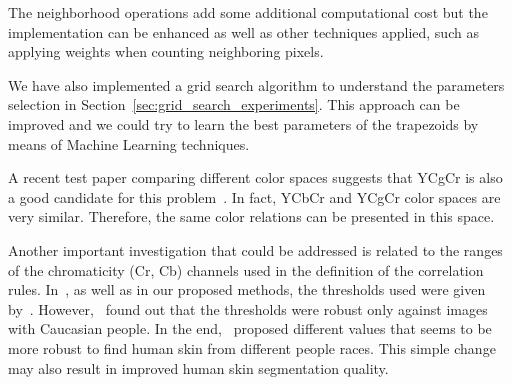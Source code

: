The neighborhood operations add some additional computational cost but the implementation can be enhanced as well as other techniques applied, such as applying weights when counting neighboring pixels.

We have also implemented a grid search algorithm to understand the parameters selection in Section~\ref{sec:grid_search_experiments}. This approach can be improved and we could try to learn the best parameters of the trapezoids by means of Machine Learning techniques.

A recent test paper comparing different color spaces suggests that YCgCr is also a good candidate for this problem~\citep{chaves:10}. In fact, YCbCr and YCgCr color spaces are very similar. Therefore, the same color relations can be presented in this space.

Another important investigation that could be addressed is related to the ranges of the chromaticity (Cr, Cb) channels used in the definition of the correlation rules. In~\citet{brancati:17}, as well as in our proposed methods, the thresholds used were given by~\citet{chai:99}. However,~\citet{basilio:11} found out that the thresholds were robust only against images with Caucasian people. In the end,~\citet{basilio:11} proposed different values that seems to be more robust to find human skin from different people races. This simple change may also result in improved human skin segmentation quality.